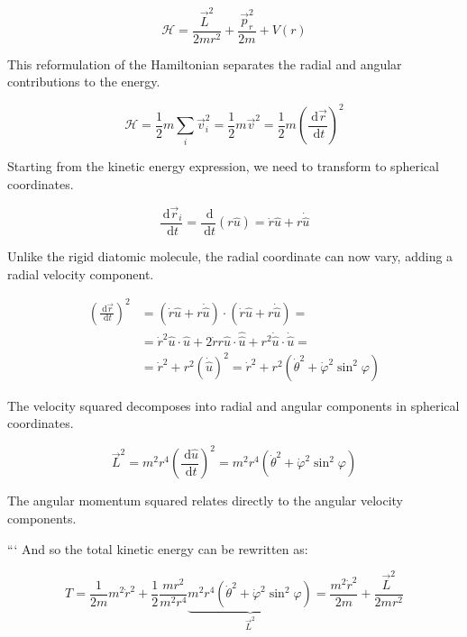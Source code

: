 \documentclass[10pt]{article}
\begin{document}
\begin{equation*}
\mathcal{H}=\frac{\vec{L}^{2}}{2 m r^{2}}+\frac{\vec{p}_{r}^{2}}{2 m}+V(r) \tag{9.3}
\end{equation*}

This reformulation of the Hamiltonian separates the radial and angular contributions to the energy.

\begin{equation*}
\mathcal{H}=\frac{1}{2} m \sum_{i} \vec{v}_{i}^{2}=\frac{1}{2} m \vec{v}^{2}=\frac{1}{2} m\left(\frac{\mathrm{~d} \vec{r}}{\mathrm{~d} t}\right)^{2} \tag{9.4}
\end{equation*}

Starting from the kinetic energy expression, we need to transform to spherical coordinates.

\begin{equation*}
\frac{\mathrm{~d} \vec{r}_{i}}{\mathrm{~d} t}=\frac{\mathrm{~d}}{\mathrm{~d} t}(r \hat{u})=\dot{r} \hat{u}+r \dot{\hat{u}} \tag{9.5}
\end{equation*}

Unlike the rigid diatomic molecule, the radial coordinate can now vary, adding a radial velocity component.

\begin{align*}
\left(\frac{\mathrm{~d} \vec{r}}{\mathrm{~d} t}\right)^{2} & =(\dot{r} \hat{u}+r \dot{\hat{u}}) \cdot(\dot{r} \hat{u}+r \dot{\hat{u}})= \\
& =\dot{r}^{2} \hat{u} \cdot \hat{u}+2 \dot{r} r \hat{u} \cdot \hat{\hat{u}}+r^{2} \dot{\hat{u}} \cdot \dot{\hat{u}}=  \tag{9.6}\\
& =\dot{r}^{2}+r^{2}(\dot{\hat{u}})^{2}=\dot{r}^{2}+r^{2}\left(\dot{\theta}^{2}+\dot{\varphi}^{2} \sin ^{2} \varphi\right)
\end{align*}

The velocity squared decomposes into radial and angular components in spherical coordinates.

\begin{equation*}
\vec{L}^{2}=m^{2} r^{4}\left(\frac{\mathrm{~d} \hat{u}}{\mathrm{~d} t}\right)^{2}=m^{2} r^{4}\left(\dot{\theta}^{2}+\dot{\varphi}^{2} \sin ^{2} \varphi\right) \tag{9.7}
\end{equation*}

The angular momentum squared relates directly to the angular velocity components.

```
And so the total kinetic energy can be rewritten as:

\begin{equation*}
T=\frac{1}{2 m} m^{2} \dot{r}^{2}+\frac{1}{2} \frac{m r^{2}}{m^{2} r^{4}} \underbrace{m^{2} r^{4}\left(\dot{\theta}^{2}+\dot{\varphi}^{2} \sin ^{2} \varphi\right)}_{\vec{L}^{2}}=\frac{m^{2} \dot{r}^{2}}{2 m}+\frac{\vec{L}^{2}}{2 m r^{2}} \tag{9.8}
\end{equation*}
\end{document}
